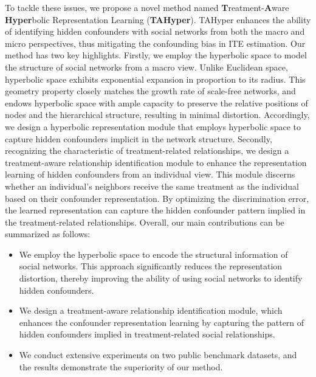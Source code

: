 \documentclass[twoside,leqno,twocolumn]{article}
\begin{document}
To tackle these issues, we propose a novel method named
\textbf{T}reatment-\textbf{A}ware \textbf{Hyper}bolic Representation Learning (\textbf{TAHyper}). TAHyper enhances the ability of identifying hidden confounders with social networks from both the macro and micro perspectives, thus mitigating the confounding bias in ITE estimation.
Our method has two key highlights.
Firstly, we employ the hyperbolic space to model the structure of social networks from a macro view. 
Unlike Euclidean space, hyperbolic space exhibits exponential expansion in proportion to its radius.
This geometry property closely matches the growth rate of scale-free networks, and endows hyperbolic space with ample capacity to preserve the relative positions of nodes and the hierarchical structure, resulting in minimal distortion. 
Accordingly, we design a hyperbolic representation module that employs hyperbolic space to capture hidden confounders implicit in the network structure.
Secondly, recognizing the characteristic of treatment-related relationships, we design a treatment-aware relationship identification module to enhance the representation learning of hidden confounders from an individual view. This module discerns whether an individual's neighbors receive the same treatment as the individual based on their confounder representation. By optimizing the discrimination error, the learned representation can capture the hidden confounder pattern implied in the treatment-related relationships.
Overall, our main contributions can be summarized as follows:
\begin{itemize}[leftmargin=*,topsep=0pt,parsep=0pt,itemsep=0pt]
\item We employ the hyperbolic space to encode the structural information of social networks. 
This approach significantly reduces the representation distortion, thereby improving the ability of using social networks to identify hidden confounders.
\item We design a treatment-aware relationship identification module, which enhances the confounder representation learning by capturing the pattern of hidden confounders implied in treatment-related social relationships.
\item We conduct extensive experiments on two public benchmark
datasets, and the results demonstrate the superiority of our method.
\end{itemize}
\vspace{-0.5em}
\end{document}
